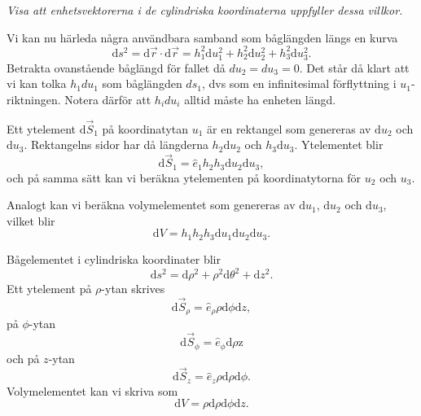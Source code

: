 \documentclass[%
oneside,                 %
final,                   %
10pt]{article}
\newenvironment{notice_mdfboxadmon}[1][]{
\begin{notice_mdfboxmdframed}[frametitle=#1]
}
{
\end{notice_mdfboxmdframed}
}
\begin{document}
\emph{Visa att enhetsvektorerna i de cylindriska koordinaterna uppfyller dessa villkor.}

Vi kan nu härleda några användbara samband som båglängden längs en kurva
\begin{equation}
\mbox{d}s^2 = \mbox{d}\vec{r}\cdot \mbox{d}\vec{r} = h_1^2\mbox{d}u_1^2 + h_2^2
\mbox{d}u_2^2 + h_3^2 \mbox{d}u_3^2.
\end{equation}
Betrakta ovanstående båglängd för fallet då $du_2=du_3=0$. Det står då klart att vi kan tolka $h_1 du_1$ som båglängden $ds_1$, dvs som en infinitesimal förflyttning i $u_1$-riktningen. Notera därför att $h_i du_i$ alltid måste ha enheten längd.

Ett ytelement $\mbox{d}\vec{S}_1$ på koordinatytan $u_1$ är en rektangel som  genereras av $\mbox{d}u_2$ och $\mbox{d}u_3$. Rektangelns sidor har då längderna $h_2\mbox{d}u_2$ och $h_3\mbox{d}u_3$.  Ytelementet blir
\begin{equation}
  \mbox{d}\vec{S}_1 =  \hat{e}_1 h_2 h_3 \mbox{d}u_2 \mbox{d}u_3,
\end{equation}
och på samma sätt kan vi beräkna ytelementen på koordinatytorna för $u_2$ och $u_3$.  

Analogt kan vi beräkna volymelementet som genereras av  $\mbox{d}u_1$, $\mbox{d}u_2$ och $\mbox{d}u_3$, vilket blir
\begin{equation}
  \mbox{d}V = h_1 h_2 h_3 \mbox{d}u_1 \mbox{d}u_2 \mbox{d}u_3.
\end{equation}


\begin{notice_mdfboxadmon}
Bågelementet i cylindriska koordinater blir
\begin{equation}
  \mbox{d}s^2 = \mbox{d}\rho^2 + \rho^2\mbox{d}\theta^2 + \mbox{d}z^2.
\end{equation}
Ett ytelement på $\rho$-ytan skrives
\begin{equation}
  \mbox{d}\vec{S}_\rho = \hat{e}_\rho \rho \mbox{d}\phi\mbox{d}z,
\end{equation}
på $\phi$-ytan
\begin{equation}
  \mbox{d}\vec{S}_\phi = \hat{e}_\phi \mbox{d}\rho\mbox{z}
\end{equation}
och på $z$-ytan
\begin{equation}
  \mbox{d}\vec{S}_z = \hat{e}_z \rho\mbox{d}\rho \mbox{d}\phi.
\end{equation}
Volymelementet kan vi skriva som
\begin{equation}
  \mbox{d}V = \rho\mbox{d}\rho \mbox{d}\phi\mbox{d}z.
\end{equation}
\end{notice_mdfboxadmon} %
\end{document}

